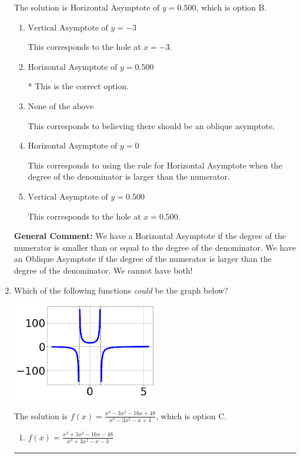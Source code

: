 \documentclass{extbook}[14pt]
\newcommand{\litem}[1]{\item #1

\rule{\textwidth}{0.4pt}}
\begin{document}
\begin{enumerate}
{The solution is \( \text{Horizontal Asymptote of } y = 0.500  \), which is option B.\begin{enumerate}[label=\Alph*.]
\item \( \text{Vertical Asymptote of } y = -3  \)

This corresponds to the hole at $x = -3$.
\item \( \text{Horizontal Asymptote of } y = 0.500  \)

* This is the correct option.
\item \( \text{None of the above} \)

This corresponds to believing there should be an oblique asymptote.
\item \( \text{Horizontal Asymptote of } y = 0  \)

This corresponds to using the rule for Horizontal Asymptote when the degree of the denominator is larger than the numerator.
\item \( \text{Vertical Asymptote of } y = 0.500  \)

This corresponds to the hole at $x = 0.500$.
\end{enumerate}

\textbf{General Comment:} We have a Horizontal Asymptote if the degree of the numerator is smaller than or equal to the degree of the denominator. We have an Oblique Asymptote if the degree of the numerator is larger than the degree of the denominator. We cannot have both!
}
\litem{
Which of the following functions \textit{could} be the graph below?

\begin{center}
    \includegraphics[width=0.5\textwidth]{../Figures/identifyGraphOfRationalFunctionCopyA.png}
\end{center}




The solution is \( f(x)=\frac{x^{3} -3 x^{2} -16 x + 48}{x^{3} -3 x^{2} -x + 3} \), which is option C.\begin{enumerate}[label=\Alph*.]
\item \( f(x)=\frac{x^{3} +3 x^{2} -16 x -48}{x^{3} +3 x^{2} -x -3} \)


\end{enumerate}}
\end{enumerate}
\end{document}

